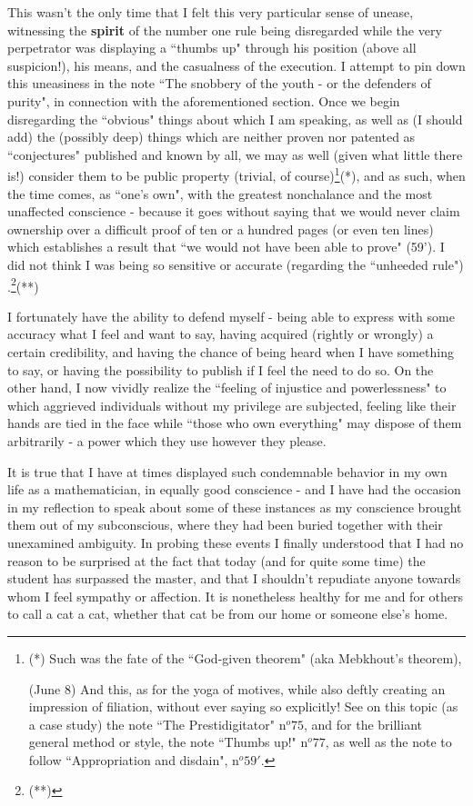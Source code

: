 This wasn't the only time that I felt this very particular sense of unease, witnessing the \textbf{spirit} of the number one rule being disregarded while the very perpetrator was displaying a ``thumbs up" through his position (above all suspicion!), his means, and the casualness of the execution. I attempt to pin down this uneasiness in the note ``The snobbery of the youth - or the defenders of purity", in connection with the aforementioned section. Once we begin disregarding the ``obvious" things about which I am speaking, as well as (I should add) the (possibly deep) things which are neither proven nor patented as ``conjectures" published and known by all, we may as well (given what little there is!) consider them to be public property (trivial, of course)\footnote{(*) Such was the fate of the ``God-given theorem" (aka Mebkhout's theorem),

(June 8) And this, as for the yoga of motives, while also deftly creating an impression of filiation, without ever saying so explicitly! See on this topic (as a case study) the note ``The Prestidigitator" n$^o 75$, and for the brilliant general method or style, the note ``Thumbs up!" n$^o 77$, as well as the note to follow ``Appropriation and disdain", n$^o 59'$.}(*), and as such, when the time comes, as ``one's own", with the greatest nonchalance and the most unaffected conscience - because it goes without saying that we would never claim ownership over a difficult proof of ten or a hundred pages (or even ten lines) which establishes a result that ``we would not have been able to prove" (59'). I did not think I was being so sensitive or accurate (regarding the ``unheeded rule")
.\footnote{(**)}(**)

I fortunately have the ability to defend myself - being able to express with some accuracy what I feel and want to say, having acquired (rightly or wrongly) a certain credibility, and having the chance of being heard when I have something to say, or having the possibility to publish if I feel the need to do so. On the other hand, I now vividly realize the ``feeling of injustice and powerlessness" to which aggrieved individuals without my privilege are subjected, feeling like their hands are tied in the face while ``those who own everything" may dispose of them arbitrarily - a power which they use however they please.

It is true that I have at times displayed such condemnable behavior in my own life as a mathematician, in equally good conscience - and I have had the occasion in my reflection to speak about some of these instances as my conscience brought them out of my subconscious, where they had been buried together with their unexamined ambiguity. In probing these events I finally understood that I had no reason to be surprised at the fact that today (and for quite some time) the student has surpassed the master, and that I shouldn't repudiate anyone towards whom I feel sympathy or affection. It is nonetheless healthy for me and for others to call a cat a cat, whether that cat be from our home or someone else's home. 

